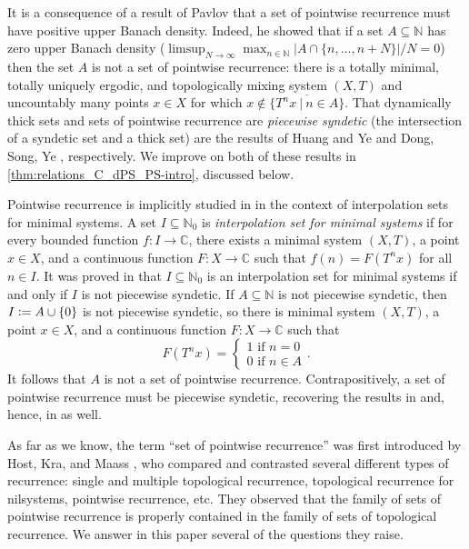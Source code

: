 \documentclass[letter,11pt]{article}
\theoremstyle{plain}
\theoremstyle{definition}
\theoremstyle{plain}
\theoremstyle{plain}
\numberwithin{equation}{section}
\newcommand{\N}{\mathbb{N}}
\newcommand{\C}{\mathbb{C}}
\newcommand{\defeq}{\vcentcolon=}
\begin{document}
It is a consequence of a result of Pavlov \cite{Pavlov-2008} that a set of pointwise recurrence must have positive upper Banach density.  Indeed, he showed that if a set $A \subseteq \N$ has zero upper Banach density ($\limsup_{N \to \infty} \max_{n \in \N} |A \cap \{n, \ldots, n + N\}| / N = 0$) then the set $A$ is not a set of pointwise recurrence: there is a totally minimal, totally uniquely ergodic, and topologically mixing system $(X, T)$ and uncountably many points $x \in X$ for which $x \not\in \overline{\{T^n x \ \big| \ n \in A\}}$.  That dynamically thick sets and sets of pointwise recurrence are \emph{piecewise syndetic} (the intersection of a syndetic set and a thick set) are the results of Huang and Ye \cite[Thm. 2.4]{huang_ye_2005} and Dong, Song, Ye \cite[Prop. 4.4]{dong_shao_ye_2012}, respectively.  We improve on both of these results in \cref{thm:relations_C_dPS_PS-intro}, discussed below.


Pointwise recurrence is implicitly studied in \cite{Glasner-Weiss-Interpolation,Koutsogiannis_Le_Moreira_Pavlov_Richter_interpolation_sets} in the context of interpolation sets for minimal systems. A set $I \subseteq \N_0$ is \emph{interpolation set for minimal systems} if for every bounded function $f: I \to \C$, there exists a minimal system $(X, T)$, a point $x \in X$, and a continuous function $F: X \to \C$ such that $f(n) = F(T^n x)$ for all $n \in I$. It was proved in \cite{Glasner-Weiss-Interpolation, Koutsogiannis_Le_Moreira_Pavlov_Richter_interpolation_sets} that $I \subseteq \N_0$ is an interpolation set for minimal systems if and only if $I$ is not piecewise syndetic. If $A \subseteq \N$ is not piecewise syndetic, then $I \defeq A \cup \{0\}$ is not piecewise syndetic, so there is minimal system $(X, T)$, a point $x \in X$, and a continuous function $F: X \to \C$ such that 
\[
    F(T^n x) = \begin{cases}
            1 \text{ if } n = 0 \\
            0 \text{ if } n \in A 
    \end{cases}.
\]
It follows that $A$ is not a set of pointwise recurrence. Contrapositively, a set of pointwise recurrence must be piecewise syndetic, recovering the results in \cite[Prop. 4.4]{dong_shao_ye_2012} and, hence, in \cite[Thm. 2.4]{huang_ye_2005} as well.
    
As far as we know, the term ``set of pointwise recurrence'' was first introduced by Host, Kra, and Maass \cite{HostKraMaass2016}, who compared and contrasted several different types of recurrence: single and multiple topological recurrence, topological recurrence for nilsystems, pointwise recurrence, etc. They observed that the family of sets of pointwise recurrence is properly contained in the family of sets of topological recurrence.  We answer in this paper several of the questions they raise.
\end{document}
